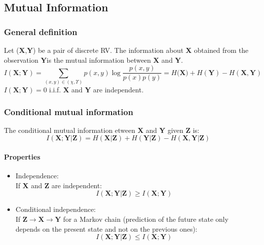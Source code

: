 \documentclass[11pt]{article}
\begin{document}
\label{key}
\subsection{Mutual Information}
\subsubsection{General definition}
Let (\textbf{X},\textbf{Y}) be a pair of discrete RV. The information about \textbf{X} obtained from the observation \textbf{Y}is the mutual information between \textbf{X} and \textbf{Y}.
\begin{equation}
    I(\textbf{X} ; \textbf{Y}) = \sum_{(x,y) \in (\chi,\Upsilon)} p(x,y)\log{\frac{p(x,y)}{p(x)p(y)}} = H(\textbf{X)} + H(\textbf{Y}) - H(\textbf{X},\textbf{Y})
 \end{equation}
 $I(\textbf{X} ; \textbf{Y}) = 0$ i.i.f. \textbf{X} and \textbf{Y} are independent.
 
 \subsubsection{Conditional mutual information}
 The conditional mutual information etween \textbf{X} and \textbf{Y} given \textbf{Z} is:
 \begin{equation}
     I(\textbf{X};\textbf{Y}|\textbf{Z}) =  H(\textbf{X}|\textbf{Z}) +  H(\textbf{Y}|\textbf{Z}) -  H(\textbf{X}, \textbf{Y}|\textbf{Z})
 \end{equation}
 
 \paragraph{Properties}
 \begin{itemize}
 	\item Independence: \\
 	 If \textbf{X} and \textbf{Z} are independent: 
 	 \begin{equation}
 	 		I(\textbf{X}; \textbf{Y}| \textbf{Z}) \geq I(\textbf{X};\textbf{Y})
 	\end{equation}
 	\item Conditional independence: \\
 	If $\textbf{Z} \rightarrow \textbf{X} \rightarrow \textbf{Y}$ for a Markov chain (prediction of the future state only depends on the present state and not on the previous ones): 
 	\begin{equation}
 			I(\textbf{X}; \textbf{Y}| \textbf{Z}) \leq I(\textbf{X};\textbf{Y})
 	\end{equation}
 \end{itemize}
\end{document}
